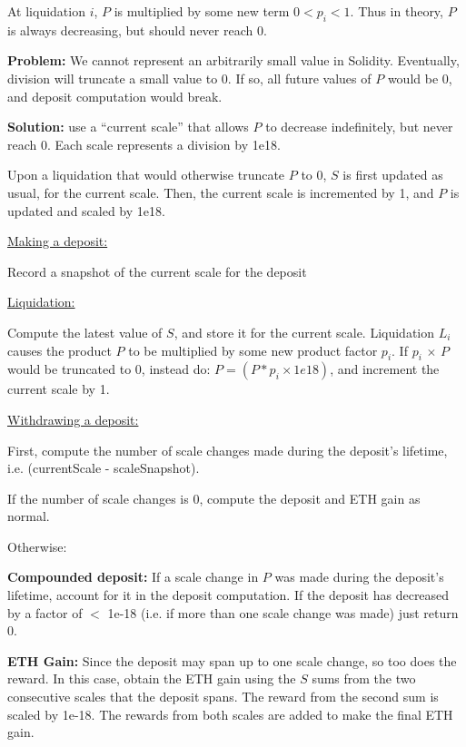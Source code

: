 \documentclass[reqno]{article}
\begin{document}
\bigskip
At liquidation $i$, $P$ is multiplied by some new term $0 < p_i <1$. Thus in theory, $P$ is always decreasing, but should never reach 0. 

\bigskip
\textbf{Problem:} We cannot represent an arbitrarily small value in Solidity.  Eventually, division will truncate a small value to 0. If so, all future values of $P$ would be 0, and deposit computation would break.

\bigskip
\textbf{Solution:} use a “current scale” that allows $P$ to decrease indefinitely, but never reach 0. Each scale represents a division by 1e18.  

\bigskip
Upon a liquidation that would otherwise truncate $P$ to 0, {$S$} is first updated as usual, for the current scale. Then, the current scale is incremented by 1, and {$P$} is updated and scaled by 1e18.

\bigskip
\underline{Making a deposit:}

Record a snapshot of the current scale for the deposit

\bigskip
\underline{Liquidation:}

Compute the latest value of {$S$}, and store it for the current scale.
Liquidation {$L_i$} causes the product {$P$} to be multiplied by some new product factor {$p_i$}.  If {$p_i$} $\times$ {$P$} would be truncated to 0, instead do: $P = (P * p_i \times 1e18)$, and increment the current scale by 1.

\bigskip
\underline{Withdrawing a deposit:}

First, compute the number of scale changes made during the deposit’s lifetime, i.e. (currentScale - scaleSnapshot).

\bigskip
If the number of scale changes is 0, compute the deposit and ETH gain as normal.

\bigskip
Otherwise:

\bigskip
\textbf{Compounded deposit:} If a scale change in {$P$} was made during the deposit's lifetime, account for it in the deposit computation. If the deposit has decreased by a factor of $<$ 1e-18 (i.e. if more than one scale change was made) just return 0.

\bigskip
\textbf{ETH Gain:} Since the deposit may span up to one scale change, so too does the reward. In this case, obtain the ETH gain using the {$S$} sums from the two consecutive scales that the deposit spans. The reward from the second sum is scaled by 1e-18. The rewards from both scales are added to make the final ETH gain.
\end{document}
